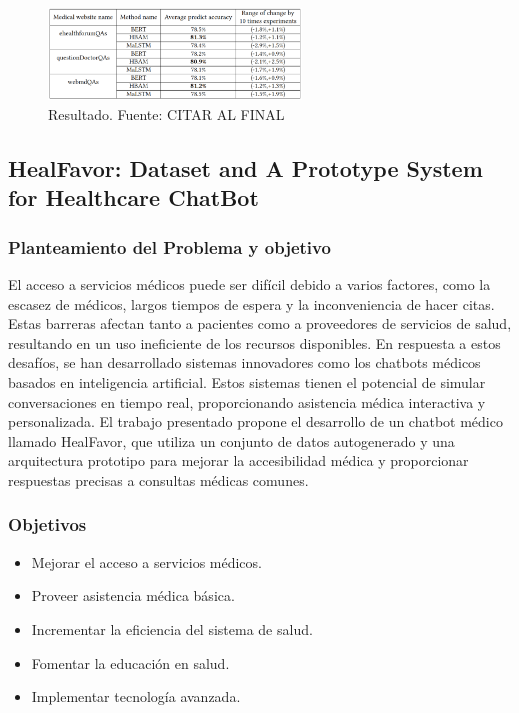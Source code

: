 			\begin{figure}[h]
				\begin{center}
					\includegraphics[width=0.6\textwidth]{2/1_antecedentes/Resultado2-5.png}
					\caption{Resultado. Fuente: CITAR AL FINAL }
				\end{center}
			\end{figure}


\subsection{HealFavor: Dataset and A Prototype System for Healthcare ChatBot} %
	\subsubsection{Planteamiento del Problema y objetivo}
		El acceso a servicios médicos puede ser difícil debido a varios factores, como la escasez de médicos, largos tiempos de espera y la inconveniencia de hacer citas. Estas barreras afectan tanto a pacientes como a proveedores de servicios de salud, resultando en un uso ineficiente de los recursos disponibles. En respuesta a estos desafíos, se han desarrollado sistemas innovadores como los chatbots médicos basados en inteligencia artificial. Estos sistemas tienen el potencial de simular conversaciones en tiempo real, proporcionando asistencia médica interactiva y personalizada. El trabajo presentado propone el desarrollo de un chatbot médico llamado HealFavor, que utiliza un conjunto de datos autogenerado y una arquitectura prototipo para mejorar la accesibilidad médica y proporcionar respuestas precisas a consultas médicas comunes.

\subsubsection{Objetivos}
	\begin{itemize}
		\item Mejorar el acceso a servicios médicos.
		\item Proveer asistencia médica básica.
		\item Incrementar la eficiencia del sistema de salud.
		\item Fomentar la educación en salud.
		\item Implementar tecnología avanzada.
	\end{itemize}	

